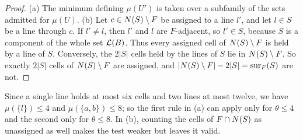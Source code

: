 \begin{proof}
(a) The minimum defining $\mu(U')$ is taken over a subfamily of the sets admitted for $\mu(U)$. (b) Let
$c\in N(S)\setminus F$ be assigned to a line $l'$, and let $l\in S$ be a line through $c$. If $l'\ne l$,
then $l'$ and $l$ are $F$-adjacent, so $l'\in S$, because $S$ is a component of the whole set $\mathcal{L}(B)$.
Thus every assigned cell of $N(S)\setminus F$ is held by a line of $S$. Conversely, the $2|S|$ cells held
by the lines of $S$ lie in $N(S)\setminus F$. So exactly $2|S|$ cells of $N(S)\setminus F$ are assigned,
and $|N(S)\setminus F|-2|S|=\operatorname{sur}_F(S)$ are not.
\end{proof}

Since a single line holds at most six cells and two lines at most twelve, we have $\mu(\{l\})\le 4$ and
$\mu(\{a,b\})\le 8$; so the first rule in (a) can apply only for $\theta\le 4$ and the second only for
$\theta\le 8$. In (b), counting the cells of $F\cap N(S)$ as unassigned as well makes the test weaker but
leaves it valid.

